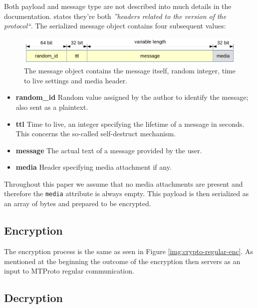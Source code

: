 \documentclass[thesis=M,english]{FITthesis}[2012/10/20]
\begin{document}
Both payload and message type are not described into much details in the documentation. \cite{telegram-aarhus} states they're both \emph{''headers related to the version of the protocol``}. The serialized message object contains four subsequent values:

\begin{figure}[htb]
	\centering
	\includegraphics[width=1\textwidth]{decrypted-message.pdf}
	\caption[Message object]{The message object contains the message itself, random integer, time to live settings and media header.}
	\label{img:crypto-secret-messageobject}
\end{figure}

\begin{itemize}
	\item \textbf{random\_id} Random value assigned by the author to identify the message; also sent as a plaintext.
	\item  \textbf{ttl} Time to live, an integer specifying the lifetime of a message in seconds. This concerns the so-called self-destruct mechanism.
	\item \textbf{message} The actual text of a message provided by the user.
	\item \textbf{media} Header specifying media attachment if any.
\end{itemize}

Throughout this paper we assume that no media attachments are present and therefore the \texttt{media} attribute is always empty. This payload is then serialized as an array of bytes and prepared to be encrypted.

\subsection{Encryption}\label{crypto-secret-enc}

The encryption process is the same as seen in Figure \ref{img:crypto-regular-enc}. As mentioned at the beginning the outcome of the encryption then servers as an input to MTProto regular communication.

\subsection{Decryption}\label{crypto-secret-dec}
\end{document}
